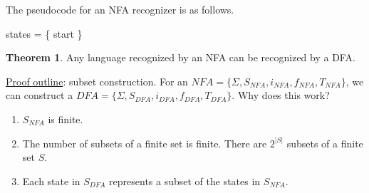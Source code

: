 \documentclass[]{article}
\theoremstyle{definition}
\newtheorem*{theorem}{Theorem}
\begin{document}
			The pseudocode for an NFA recognizer is as follows. \\
			\begin{algorithm}[H]
				states = \{ start \}\;
			\end{algorithm}

			\begin{theorem}
				Any language recognized by an NFA can be recognized by a DFA.
			\end{theorem}

			\underline{Proof outline}: subset construction. For an $NFA = \{ \Sigma, S_{NFA}, i_{NFA}, f_{NFA}, T_{NFA} \}$, we can construct a $DFA = \{ \Sigma, S_{DFA}, i_{DFA}, f_{DFA}, T_{DFA} \}$. Why does this work?
			\begin{enumerate}
				\item $S_{NFA}$ is finite.
				\item The number of subsets of a finite set is finite. There are $2^{|S|}$ subsets of a finite set $S$.
				\item Each state in $S_{DFA}$ represents a subset of the states in $S_{NFA}$.
			\end{enumerate}
\end{document}
